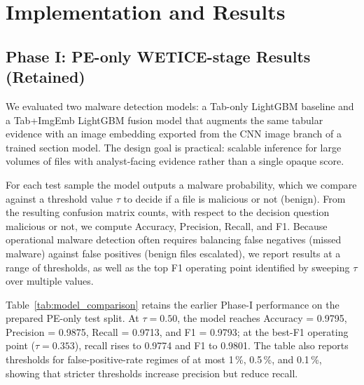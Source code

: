 \documentclass[conference]{IEEEtran}
\begin{document}
\section{Implementation and Results}
\label{section:implementation-and-results}

\subsection{Phase I: PE-only WETICE-stage Results (Retained)}
We evaluated two malware detection models: a Tab-only LightGBM baseline and a Tab+ImgEmb LightGBM fusion model that augments the same tabular evidence with an image embedding exported from the CNN image branch of a trained section model.
The design goal is practical: scalable inference for large volumes of files with analyst-facing evidence rather than a single opaque score.


For each test sample the model outputs a malware probability, which we compare against a threshold value $\tau$ to decide if a file is malicious or not (benign).
From the resulting confusion matrix counts, with respect to the decision question malicious or not, we compute Accuracy, Precision, Recall, and F1.
Because operational malware detection often requires balancing false negatives (missed malware) against false positives (benign files escalated), we report results at a range of thresholds, as well as the top F1 operating point identified by sweeping $\tau$ over multiple values.


Table~\ref{tab:model_comparison} retains the earlier Phase-I performance on the prepared PE-only test split.
At $\tau=0.50$, the model reaches Accuracy = 0.9795, Precision = 0.9875, Recall = 0.9713, and F1 = 0.9793; at the best-F1 operating point ($\tau=0.353$), recall rises to 0.9774 and F1 to 0.9801.
The table also reports thresholds for false-positive-rate regimes of at most 1\,\%, 0.5\,\%, and 0.1\,\%, showing that stricter thresholds increase precision but reduce recall.
\end{document}
